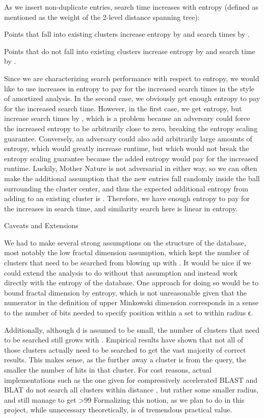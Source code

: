 \documentclass{amsbook}
\theoremstyle{definition}
\theoremstyle{remark}
\numberwithin{equation}{section}
\begin{document}
As we insert non-duplicate entries, search time increases with entropy (defined as mentioned as the weight of the 2-level distance spanning tree):

Points that fall into existing clusters increase entropy by  and search times by .

Points that do not fall into existing clusters increase entropy by  and search time by .

Since we are characterizing search performance with respect to entropy, we would like to use increases in entropy to pay for the increased search times in the style of amortized analysis.
In the second case, we obviously get enough entropy to pay for the increased search time.
However, in the first case, we get  entropy, but increase search times by , which is a problem because an adversary could force the increased entropy to be arbitrarily close to zero, breaking the entropy scaling guarantee.
Conversely, an adversary could also add arbitrarily large amounts of entropy, which would greatly increase runtime, but which would not break the entropy scaling guarantee because the added entropy would pay for the increased runtime.
Luckily, Mother Nature is not adversarial in either way, so we can often make the additional assumption that the new entries fall randomly inside the ball surrounding the cluster center, and thus the expected additional entropy from adding to an existing cluster is .
Therefore, we have enough entropy to pay for the increases in search time, and similarity search here is linear in entropy.

Caveats and Extensions

We had to make several strong assumptions on the structure of the database, most notably the low fractal dimension assumption, which kept the number of clusters that need to be searched from blowing up with .
It would be nice if we could extend the analysis to do without that assumption and instead work directly with the entropy of the database.
One approach for doing so would be to bound fractal dimension by entropy, which is not unreasonable given that the numerator in the definition of upper Minkowski dimension corresponds in a sense to the number of bits needed to specify position within a set to within radius ϵ.

Additionally, although d is assumed to be small, the number of clusters that need to be searched still grows with .
Empirical results have shown that not all of those clusters actually need to be searched to get the vast majority of correct results.
This makes sense, as the further away a cluster is from the query, the smaller the number of hits in that cluster.
For cost reasons, actual implementations such as the one given for compressively accelerated BLAST and BLAT do not search all clusters within distance , but rather some smaller radius, and still manage to get >99%
Formalizing this notion, as we plan to do in this project, while unnecessary theoretically, is of tremendous practical value.
\end{document}
